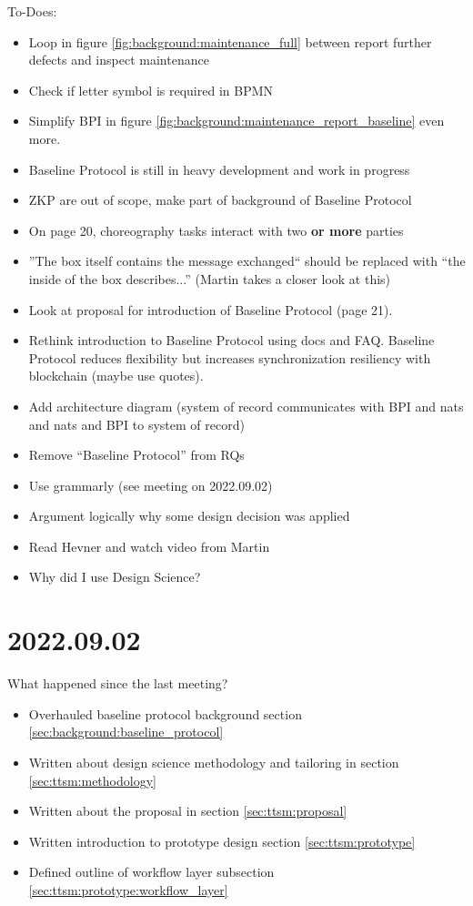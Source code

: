 To-Does:
\begin{itemize}
    \item[\checkmark] Loop in figure \ref{fig:background:maintenance_full} between report further defects and inspect maintenance
    \item[\checkmark] Check if letter symbol is required in BPMN
    \item[\checkmark] Simplify BPI in figure \ref{fig:background:maintenance_report_baseline} even more.
    \item[\checkmark] Baseline Protocol is still in heavy development and work in progress
    \item[\checkmark] ZKP are out of scope, make part of background of Baseline Protocol
    \item[\checkmark] On page 20, choreography tasks interact with two \textbf{or more} parties
    \item[\checkmark] ''The box itself contains the message exchanged`` should be replaced with ``the inside of the box describes...'' (Martin takes a closer look at this)
    \item[\checkmark] Look at proposal for introduction of Baseline Protocol (page 21).
    \item[\checkmark] Rethink introduction to Baseline Protocol using docs and FAQ. Baseline Protocol reduces flexibility but increases synchronization resiliency with blockchain (maybe use quotes).
    \item[\checkmark] Add architecture diagram (system of record communicates with BPI and nats and nats and BPI to system of record)
    \item[\checkmark] Remove ``Baseline Protocol'' from RQs
    \item[\checkmark] Use grammarly (see meeting on 2022.09.02)
    \item[\checkmark] Argument logically why some design decision was applied
    \item[\checkmark] Read Hevner and watch video from Martin
    \item[\checkmark] Why did I use Design Science?
\end{itemize}


\section{2022.09.02}
What happened since the last meeting?
\begin{itemize}
    \item Overhauled baseline protocol background section \ref{sec:background:baseline_protocol}
    \item Written about design science methodology and tailoring in section \ref{sec:ttsm:methodology}
    \item Written about the proposal in section \ref{sec:ttsm:proposal}
    \item Written introduction to prototype design section \ref{sec:ttsm:prototype}
    \item Defined outline of workflow layer subsection \ref{sec:ttsm:prototype:workflow_layer}
\end{itemize}

